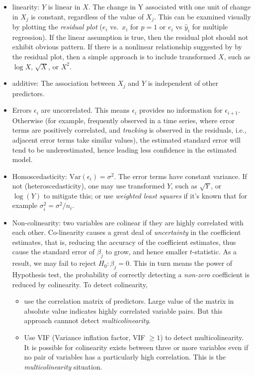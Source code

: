 \documentclass[
  letterpaper,
  DIV=11,
  numbers=noendperiod]{scrreprt}
\begin{document}
\begin{itemize}
\item
  linearity: \(Y\) is linear in \(X\). The change in Y associated with
  one unit of change in \(X_j\) is constant, regardless of the value of
  \(X_j\). This can be examined visually by plotting the \emph{residual
  plot} (\(e_i\) vs.~\(x_i\) for \(p=1\) or \(e_i\) vs \(\hat{y}_i\) for
  multiple regression). If the linear assumption is true, then the
  residual plot should not exhibit obvious pattern. If there is a
  nonlinear relationship suggested by by the residual plot, then a
  simple approach is to include transformed \(X\), such as \(\log X\),
  \(\sqrt{X}\), or \(X^2\).
\item
  additive: The association between \(X_j\) and \(Y\) is independent of
  other predictors.
\item
  Errors \(\epsilon_i\) are uncorrelated. This means \(\epsilon_i\)
  provides no information for \(\epsilon_{i+1}\). Otherwise (for
  example, frequently observed in a time series, where error terms are
  positively correlated, and \emph{tracking} is observed in the
  residuals, i.e., adjacent error terms take similar values), the
  estimated standard error will tend to be underestimated, hence leading
  less confidence in the estimated model.
\item
  Homoscedasticity: \(\text{Var}(\epsilon_i) =\sigma^2\). The error
  terms have constant variance. If not (heteroscedasticity), one may use
  transformed \(Y\), such as \(\sqrt{Y}\), or \(\log(Y)\) to mitigate
  this; or use \emph{weighted least squares} if it's known that for
  example \(\sigma_i^2=\sigma^2/n_i\).
\item
  Non-colinearity: two variables are colinear if they are highly
  correlated with each other. Co-linearity causes a great deal of
  \emph{uncertainty} in the coefficient estimates, that is, reducing the
  accuracy of the coefficient estimates, thus cause the standard error
  of \(\beta_j\) to grow, and hence smaller \(t\)-statistic. As a
  result, we may fail to reject \(H_0: \beta_j=0\). This in turn means
  the power of Hypothesis test, the probability of correctly detecting a
  \emph{non-zero} coefficient is reduced by colinearity. To detect
  colinearity,

  \begin{itemize}
  \item
    use the correlation matrix of predictors. Large value of the matrix
    in absolute value indicates highly correlated variable pairs. But
    this approach cannnot detect \emph{multicolinearity}.
  \item
    Use VIF (Variance inflation factor, VIF \(\ge 1\)) to detect
    multicolinearity. It is possible for colinearity exists between
    three or more variables even if no pair of variables has a
    particularly high correlation. This is the \emph{multicolinearity}
    situation.
  \end{itemize}


\end{itemize}
\end{document}
